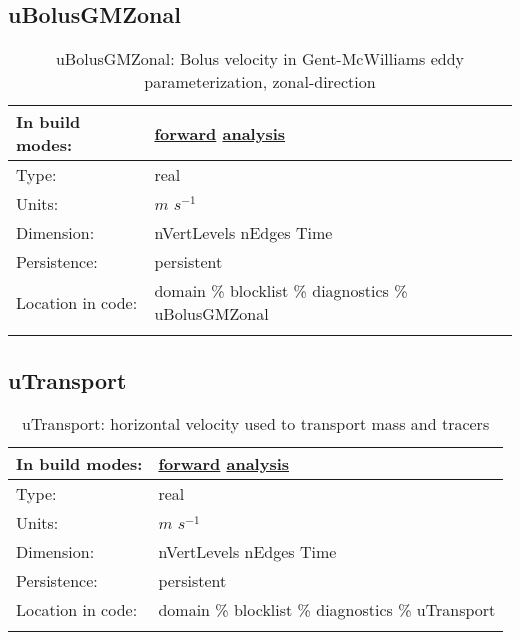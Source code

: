 \subsection[uBolusGMZonal]{uBolusGMZonal}
\label{subsec:var_sec_diagnostics_uBolusGMZonal}
\begin{center}
\begin{longtable}{| p{2.0in} | p{4.0in} |}
        \hline 
        In build modes: & \hyperref[subsec:forward_var_tab_diagnostics]{forward} \hyperref[subsec:analysis_var_tab_diagnostics]{analysis} \\
        \hline 
        Type: & real \\
        \hline 
        Units: & $m$ $s^{-1}$ \\
        \hline 
        Dimension: & nVertLevels nEdges Time \\
        \hline 
        Persistence: & persistent \\
        \hline 
		 Location in code: & domain \% blocklist \% diagnostics \% uBolusGMZonal \\
		 \hline 
    \caption{uBolusGMZonal: Bolus velocity in Gent-McWilliams eddy parameterization, zonal-direction}
\end{longtable}
\end{center}
\subsection[uTransport]{uTransport}
\label{subsec:var_sec_diagnostics_uTransport}
\begin{center}
\begin{longtable}{| p{2.0in} | p{4.0in} |}
        \hline 
        In build modes: & \hyperref[subsec:forward_var_tab_diagnostics]{forward} \hyperref[subsec:analysis_var_tab_diagnostics]{analysis} \\
        \hline 
        Type: & real \\
        \hline 
        Units: & $m$ $s^{-1}$ \\
        \hline 
        Dimension: & nVertLevels nEdges Time \\
        \hline 
        Persistence: & persistent \\
        \hline 
		 Location in code: & domain \% blocklist \% diagnostics \% uTransport \\
		 \hline 
    \caption{uTransport: horizontal velocity used to transport mass and tracers}
\end{longtable}
\end{center}
